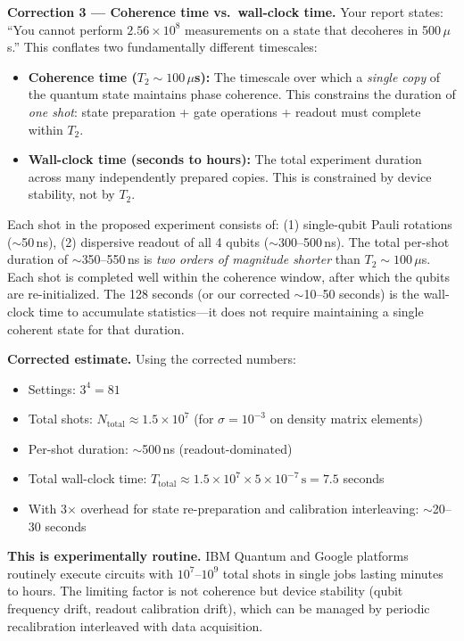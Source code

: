 \documentclass[11pt,a4paper]{article}
\begin{document}
\textbf{Correction 3 --- Coherence time vs.\ wall-clock time.} Your report states: ``You cannot perform $2.56 \times 10^8$ measurements on a state that decoheres in 500\,$\mu$s.'' This conflates two fundamentally different timescales:

\begin{itemize}[leftmargin=*]
\item \textbf{Coherence time ($T_2 \sim 100$\,$\mu$s):} The timescale over which a \emph{single copy} of the quantum state maintains phase coherence. This constrains the duration of \emph{one shot}: state preparation + gate operations + readout must complete within $T_2$.
\item \textbf{Wall-clock time (seconds to hours):} The total experiment duration across many independently prepared copies. This is constrained by device stability, not by $T_2$.
\end{itemize}

Each shot in the proposed experiment consists of: (1) single-qubit Pauli rotations ($\sim$50\,ns), (2) dispersive readout of all 4 qubits ($\sim$300--500\,ns). The total per-shot duration of $\sim$350--550\,ns is \emph{two orders of magnitude shorter} than $T_2 \sim 100$\,$\mu$s. Each shot is completed well within the coherence window, after which the qubits are re-initialized. The 128 seconds (or our corrected $\sim$10--50 seconds) is the wall-clock time to accumulate statistics---it does not require maintaining a single coherent state for that duration.

\textbf{Corrected estimate.} Using the corrected numbers:
\begin{itemize}[leftmargin=*]
\item Settings: $3^4 = 81$
\item Total shots: $N_{\text{total}} \approx 1.5 \times 10^7$ (for $\sigma = 10^{-3}$ on density matrix elements)
\item Per-shot duration: $\sim$500\,ns (readout-dominated)
\item Total wall-clock time: $T_{\text{total}} \approx 1.5 \times 10^7 \times 5 \times 10^{-7}\,\text{s} = 7.5$ seconds
\item With 3$\times$ overhead for state re-preparation and calibration interleaving: $\sim$20--30 seconds
\end{itemize}

\textbf{This is experimentally routine.} IBM Quantum and Google platforms routinely execute circuits with $10^7$--$10^9$ total shots in single jobs lasting minutes to hours. The limiting factor is not coherence but device stability (qubit frequency drift, readout calibration drift), which can be managed by periodic recalibration interleaved with data acquisition.
\end{document}
